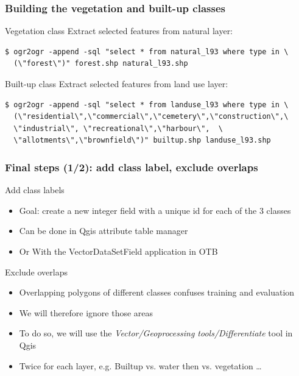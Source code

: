 \documentclass[8pt]{beamer}
\begin{document}
\begin{frame}[fragile]
\frametitle{Building the vegetation and built-up classes}
\begin{block}{Vegetation class}
Extract selected features from natural layer:
\begin{scriptsize}
\begin{verbatim}
$ ogr2ogr -append -sql "select * from natural_l93 where type in \
  (\"forest\")" forest.shp natural_l93.shp
\end{verbatim}
\end{scriptsize}
\end{block}

\begin{block}{Built-up class}
Extract selected features from land use layer:
\begin{scriptsize}
\begin{verbatim}
$ ogr2ogr -append -sql "select * from landuse_l93 where type in \
  (\"residential\",\"commercial\",\"cemetery\",\"construction\",\
  \"industrial\", \"recreational\",\"harbour\",  \
  \"allotments\",\"brownfield\")" builtup.shp landuse_l93.shp
\end{verbatim}
\end{scriptsize}
\end{block}
\end{frame}

\begin{frame}[fragile]
\frametitle{Final steps (1/2): add class label, exclude overlaps}

\begin{block}{Add class labels}
\begin{itemize}
\item Goal: create a new integer field with a unique id for each of the 3 classes
\item Can be done in Qgis attribute table manager
\item Or With the VectorDataSetField application in OTB
\end{itemize}
\end{block}

\begin{block}{Exclude overlaps}
\begin{itemize}
\item Overlapping polygons of different classes confuses training and evaluation
\item We will therefore ignore those areas
\item To do so, we will use the \textit{Vector/Geoprocessing tools/Differentiate} tool in Qgis
\item Twice for each layer, e.g. Builtup vs. water then vs. vegetation \ldots
\end{itemize}
\end{block}
\end{frame}
\end{document}
